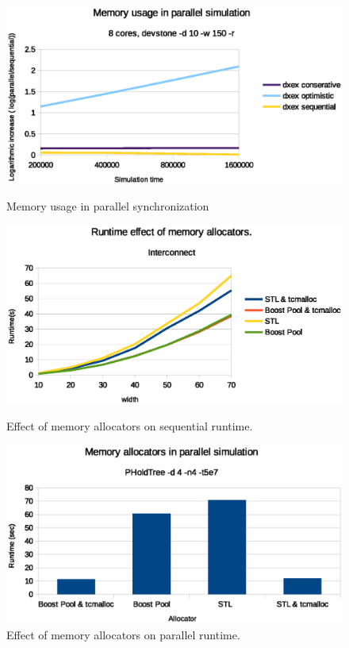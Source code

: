 \begin{figure}
	\center
	
	\includegraphics[width=\modelfraction\columnwidth]{fig/memincrease.eps}
	\caption{Memory usage in parallel synchronization}
	\label{fig:memincrease}
	
	\includegraphics[width=\modelfraction\columnwidth]{fig/memory_allocators.eps}
	\caption{Effect of memory allocators on sequential runtime.}
	\label{fig:memallocators}
	
	\includegraphics[width=\modelfraction\columnwidth]{fig/memory_allocators_parallel.eps}
	\caption{Effect of memory allocators on parallel runtime.}
	\label{fig:memallocators_parallel}
\end{figure}
